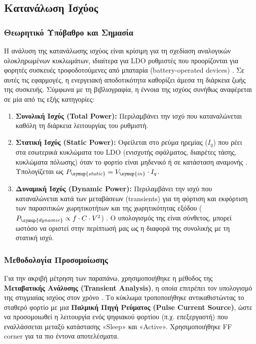 \subsection{Κατανάλωση Ισχύος}

\subsubsection{Θεωρητικό Υπόβαθρο και Σημασία}
Η ανάλυση της κατανάλωσης ισχύος είναι κρίσιμη για τη σχεδίαση αναλογικών ολοκληρωμένων κυκλωμάτων, ιδιαίτερα για LDO ρυθμιστές που προορίζονται για φορητές συσκευές τροφοδοτούμενες από μπαταρία (battery-operated devices) \cite{Maloberti}. Σε αυτές τις εφαρμογές, η ενεργειακή αποδοτικότητα καθορίζει άμεσα τη διάρκεια ζωής της συσκευής. Σύμφωνα με τη βιβλιογραφία, η έννοια της ισχύος συνήθως αναφέρεται σε μία από τις εξής κατηγορίες:
\begin{enumerate}
    \item \textbf{Συνολική Ισχύς (Total Power):} Περιλαμβάνει την ισχύ που καταναλώνεται καθόλη τη διάρκεια λειτουργίας του ρυθμιστή.
    \item \textbf{Στατική Ισχύς (Static Power):} Οφείλεται στο ρεύμα ηρεμίας ($I_q$) που ρέει στα εσωτερικά κυκλώματα του LDO (ενισχυτής σφάλματος, διαιρέτες τάσης, κυκλώματα πόλωσης) όταν το φορτίο είναι μηδενικό ή σε κατάσταση αναμονής \cite{Rincón-Mora}. Υπολογίζεται ως $P_{\symup{static}} = V_{\symup{in}} \cdot I_q$.
    \item \textbf{Δυναμική Ισχύς (Dynamic Power):} Περιλαμβάνει την ισχύ που καταναλώνεται κατά των μεταβάσεων (transients) για τη φόρτιση και εκφόρτιση των παρασιτικών χωρητικοτήτων και της χωρητικότητας εξόδου ($P_{\symup{dynamic}} \propto f \cdot C \cdot V^2$) \cite{Rincón-Mora}. Ο υπολογισμός της είναι σύνθετος, μπορεί ωστόσο να οριστεί στην περίπτωσή μας ως η διαφορά της συνολικής με τη στατική ισχύ.

\end{enumerate}

\subsubsection{Μεθοδολογία Προσομοίωσης}
Για την ακριβή μέτρηση των παραπάνω, χρησιμοποιήθηκε η μέθοδος της \textbf{Μεταβατικής Ανάλυσης (Transient Analysis)}, η οποία επιτρέπει τον υπολογισμό της στιγμιαίας ισχύος στον χρόνο \cite{Rincón-Mora}.
Το κύκλωμα τροποποιήθηκε αντικαθιστώντας το σταθερό φορτίο με μια \textbf{Παλμική Πηγή Ρεύματος (Pulse Current Source)}, ώστε να προσομοιωθεί η λειτουργία ενός ψηφιακού φορτίου (π.χ. επεξεργαστή) που εναλλάσσεται μεταξύ κατάστασης «Sleep» και «Active». Χρησιμοποιήθηκε FF corner για τα πιο έντονα αποτελέσματα.

